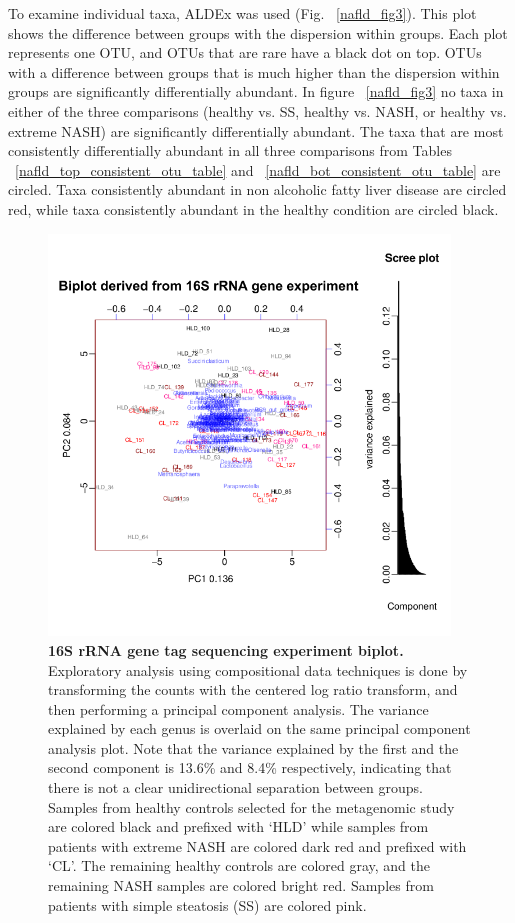 To examine individual taxa, ALDEx was used (Fig. ~\ref{nafld_fig3}). This plot shows the difference between groups with the dispersion within groups. Each plot represents one OTU, and OTUs that are rare have a black dot on top. OTUs with a difference between groups that is much higher than the dispersion within groups are significantly differentially abundant. In figure ~\ref{nafld_fig3} no taxa in either of the three comparisons (healthy vs. SS, healthy vs. NASH, or healthy vs. extreme NASH) are significantly differentially abundant. The taxa that are most consistently differentially abundant in all three comparisons from Tables ~\ref{nafld_top_consistent_otu_table} and ~\ref{nafld_bot_consistent_otu_table} are circled. Taxa consistently abundant in non alcoholic fatty liver disease are circled red, while taxa consistently abundant in the healthy condition are circled black.

\begin{figure}[h]
\begin{center}
\includegraphics[width=0.95\textwidth]{nafld_16s_biplot.png}
\caption[16S rRNA gene tag sequencing experiment biplot.]{\textbf{16S rRNA gene tag sequencing experiment biplot.} Exploratory analysis using compositional data techniques is done by transforming the counts with the centered log ratio transform, and then performing a principal component analysis. The variance explained by each genus is overlaid on the same principal component analysis plot. Note that the variance explained by the first and the second component is 13.6\% and 8.4\% respectively, indicating that there is not a clear unidirectional separation between groups. Samples from healthy controls selected for the metagenomic study are colored black and prefixed with `HLD' while samples from patients with extreme NASH are colored dark red and prefixed with `CL'. The remaining healthy controls are colored gray, and the remaining NASH samples are colored bright red. Samples from patients with simple steatosis (SS) are colored pink.}
\label{nafld_16s_biplot}
\end{center}
\end{figure}

